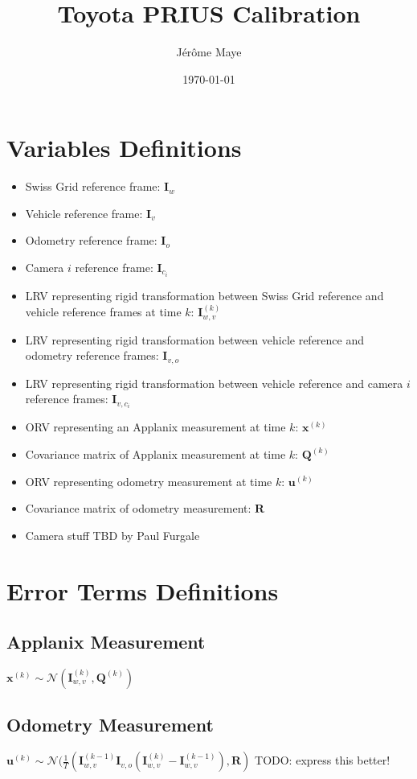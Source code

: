 \documentclass[12pt]{article}
\title{Toyota PRIUS Calibration}
\author{J\'{e}r\^{o}me Maye}
\date{\today}
\begin{document}
  \maketitle

  \section{Variables Definitions}\label{sec:model}
    \begin{itemize}
      \item Swiss Grid reference frame: $\mathbf{I}_w$
      \item Vehicle reference frame: $\mathbf{I}_v$
      \item Odometry reference frame: $\mathbf{I}_o$
      \item Camera $i$ reference frame: $\mathbf{I}_{c_i}$
      \item LRV representing rigid transformation between Swiss Grid reference
        and vehicle reference frames at time $k$: $\mathbf{I}_{w,v}^{(k)}$
      \item LRV representing rigid transformation between vehicle reference and
        odometry reference frames: $\mathbf{I}_{v,o}$
      \item LRV representing rigid transformation between vehicle reference and
        camera $i$ reference frames: $\mathbf{I}_{v,c_i}$
      \item ORV representing an Applanix measurement at time $k$:
        $\mathbf{x}^{(k)}$
      \item Covariance matrix of Applanix measurement at time $k$:
        $\mathbf{Q}^{(k)}$
      \item ORV representing odometry measurement at time $k$:
        $\mathbf{u}^{(k)}$
      \item Covariance matrix of odometry measurement:
        $\mathbf{R}$
      \item Camera stuff TBD by Paul Furgale
    \end{itemize}

  \section{Error Terms Definitions}\label{sec:errors}
    \subsection{Applanix Measurement}
      $\mathbf{x}^{(k)}\sim\mathcal{N}(\mathbf{I}_{w,v}^{(k)},
        \mathbf{Q}^{(k)})$

    \subsection{Odometry Measurement}
      $\mathbf{u}^{(k)}\sim\mathcal{N}(\frac{1}{T}(\mathbf{I}_{w,v}^{(k-1)}
      \mathbf{I}_{v,o}(\mathbf{I}_{w,v}^{(k)}- \mathbf{I}_{w,v}^{(k-1)}),
      \mathbf{R})$
      TODO: express this better!
\end{document}
